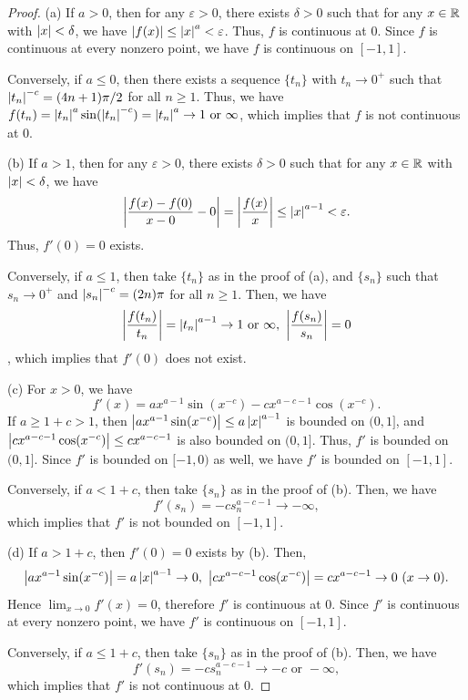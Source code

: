 \documentclass{article}
\begin{document}
\begin{proof}
  (a) If \( a>0 \), then for any \( \varepsilon>0 \), there exists \( \delta>0 \) such that for any \( x\in\mathbb{R} \) with \( \left|x\right|<\delta \), we have \( \left|f(x)\right|\le \left|x\right|^a<\varepsilon \). Thus, \( f \) is continuous at \( 0 \). Since \( f \) is continuous at every nonzero point, we have \( f \) is continuous on \( [-1,1] \).\par
  Conversely, if \( a\le 0 \), then there exists a sequence \( \{t_n\} \) with \( t_n\to 0^+ \) such that \( \left|t_n\right|^{-c}=(4n+1)\pi/2 \) for all \( n\ge 1 \). Thus, we have \( f(t_n)=\left|t_n\right|^a\sin(\left|t_n\right|^{-c})=\left|t_n\right|^a\to 1 \text{ or }\infty \), which implies that \( f \) is not continuous at \( 0 \).\par
  (b) If \( a>1 \), then for any \( \varepsilon>0 \), there exists \( \delta>0 \) such that for any \( x\in\mathbb{R} \) with \( \left|x\right|<\delta \), we have
  \[ \left|\frac{f(x)-f(0)}{x-0}-0\right|=\left|\frac{f(x)}{x}\right|\le \left|x\right|^{a-1}<\varepsilon. \]
  Thus, \( f'(0)=0 \) exists.\par
  Conversely, if \( a\le 1 \), then take \( \{t_n\} \) as in the proof of (a), and \( \{s_n\} \) such that \( s_n\to 0^+ \) and \( \left|s_n\right|^{-c}=(2n)\pi \) for all \( n\ge 1 \). Then, we have 
  \[ \left|\frac{f(t_n)}{t_n}\right|=\left|t_n\right|^{a-1}\to 1 \text{ or }\infty,\ \left|\frac{f(s_n)}{s_n}\right|=0 \], which implies that \( f'(0) \) does not exist.\par
  (c) For \( x>0 \), we have
  \[ f'(x) = a x^{a-1} \sin(x^{-c}) - c x^{a-c-1} \cos(x^{-c}). \]
  If \( a\ge 1+c>1 \), then \( \left|ax^{a-1}\sin(x^{-c})\right| \le a\left|x\right|^{a-1} \) is bounded on \( (0,1] \), and \( \left|c x^{a-c-1} \cos(x^{-c})\right| \le c x^{a-c-1} \) is also bounded on \( (0,1] \). Thus, \( f' \) is bounded on \( (0,1] \). Since \( f' \) is bounded on \( [-1,0) \) as well, we have \( f' \) is bounded on \( [-1,1] \).\par
  Conversely, if \( a<1+c \), then take \( \{s_n\} \) as in the proof of (b). Then, we have
  \[ f'(s_n)=-cs_n^{a-c-1}\to-\infty, \]
  which implies that \( f' \) is not bounded on \( [-1,1] \).\par
  (d) If \( a>1+c \), then \( f'(0)=0 \) exists by (b). Then,
  \[ \abs{ax^{a-1}\sin(x^{-c})}=a\abs{x}^{a-1}\to 0,\ \abs{c x^{a-c-1} \cos(x^{-c})}=c x^{a-c-1}\to 0\ (x\to 0). \]
  Hence \( \lim_{x\to 0}f'(x)=0 \), therefore \( f' \) is continuous at \( 0 \). Since \( f' \) is continuous at every nonzero point, we have \( f' \) is continuous on \( [-1,1] \).\par
  Conversely, if \( a\le 1+c \), then take \( \{s_n\} \) as in the proof of (b). Then, we have
  \[ f'(s_n)=-cs_n^{a-c-1}\to -c \text{ or } -\infty, \]
  which implies that \( f' \) is not continuous at \( 0 \).
\end{proof}
\end{document}
